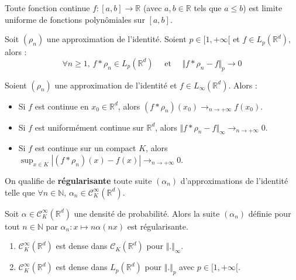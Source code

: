   \begin{application}
    Toute fonction continue $f : [a,b] \rightarrow \mathbb{R}$ (avec $a, b \in \mathbb{R}$ tels que $a \leq b$) est limite uniforme de fonctions polynômiales sur $[a, b]$.
  \end{application}


  \begin{theorem}
    Soit $(\rho_n)$ une approximation de l'identité. Soient $p \in [1, +\infty[$ et $f \in L_p(\mathbb{R}^d)$, alors :
    \[ \forall n \geq 1, \, f * \rho_n \in L_p(\mathbb{R}^d) \quad \text{ et } \quad \Vert f * \rho_n - f \Vert_p \longrightarrow 0 \]
  \end{theorem}

  \begin{theorem}
    Soient $(\rho_n)$ une approximation de l'identité et $f \in L_\infty(\mathbb{R}^d)$. Alors :
    \begin{itemize}
      \item Si $f$ est continue en $x_0 \in \mathbb{R}^d$, alors $(f * \rho_n)(x_0) \longrightarrow_{n \rightarrow +\infty} f(x_0)$.
      \item Si $f$ est uniformément continue sur $\mathbb{R}^d$, alors $\Vert f * \rho_n - f \Vert_\infty \longrightarrow_{n \rightarrow +\infty} 0$.
      \item Si $f$ est continue sur un compact $K$, alors $\sup_{x \in K} |(f * \rho_n)(x) - f(x)| \longrightarrow_{n \rightarrow +\infty} 0$.
    \end{itemize}
  \end{theorem}

  \begin{definition}
    On qualifie de \textbf{régularisante} toute suite $(\alpha_n)$ d'approximations de l'identité telle que $\forall n \in \mathbb{N}, \, \alpha_n \in \mathcal{C}^\infty_K(\mathbb{R}^d)$.
  \end{definition}


  \begin{example}
    Soit $\alpha \in \mathcal{C}^\infty_K(\mathbb{R}^d)$ une densité de probabilité. Alors la suite $(\alpha_n)$ définie pour tout $n \in \mathbb{N}$ par $\alpha_n : x \mapsto n \alpha(nx)$ est régularisante.
  \end{example}


  \begin{application}
    \begin{enumerate}[label=(\roman*)]
      \item $\mathcal{C}^\infty_K(\mathbb{R}^d)$ est dense dans $\mathcal{C}_K(\mathbb{R}^d)$ pour $\Vert . \Vert_\infty$.
      \item $\mathcal{C}^\infty_K(\mathbb{R}^d)$ est dense dans $L_p(\mathbb{R}^d)$ pour $\Vert . \Vert_p$ avec $p \in [1, +\infty[$.
    \end{enumerate}
  \end{application}

